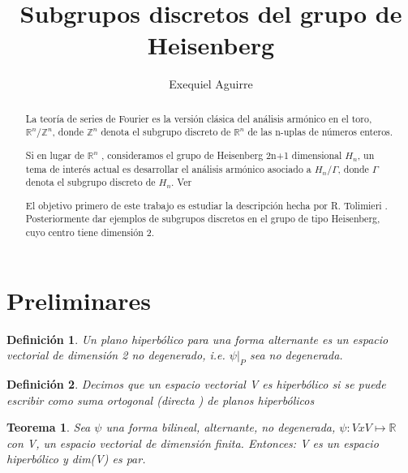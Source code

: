 \documentclass[12pt]{article}
\author{Exequiel Aguirre}
\title{Subgrupos discretos del grupo de Heisenberg }
\date{}
\newtheorem{theorem}{Teorema}
\newtheorem{definition}{Definición}
\begin{document}
\maketitle

\begin{abstract}
La teoría de series de Fourier es la versión clásica del análisis armónico en el toro,
$\mathbb{R}^n /\mathbb{Z}^n$, donde $\mathbb{Z}^n$ denota el subgrupo discreto de $\mathbb{R}^n$ de
las n-uplas de números enteros.

Si en lugar de $\mathbb{R}^n$ , consideramos el grupo de Heisenberg 2n+1 dimensional $H_n$, un tema
de interés actual es desarrollar el análisis armónico asociado a $H_n/\Gamma$, donde $\Gamma$ 
denota el subgrupo discreto de $H_n$. Ver \cite{Th} 

El objetivo primero de este trabajo es estudiar la descripción hecha por R. Tolimieri \cite{To}.
Posteriormente dar ejemplos de subgrupos discretos en el grupo de tipo Heisenberg, cuyo centro tiene
dimensión 2.

\end{abstract}


 

\section{Preliminares}
\begin{definition} 
 Un plano hiperbólico para una forma alternante es un espacio vectorial de dimensión 2 no degenerado,
  i.e. $\psi|_P$ sea no degenerada. 
\end{definition}

\begin{definition}   
 Decimos que un espacio vectorial V es hiperbólico si se puede escribir como suma ortogonal (directa ) de
 planos hiperbólicos
\end{definition}

\begin{theorem}
 Sea $\psi$ una forma bilineal, alternante, no degenerada, $\psi:VxV\mapsto \mathbb{R}$ con V, un espacio 
 vectorial de dimensión finita.
 Entonces: V es un espacio hiperbólico y dim(V) es par.
\end{theorem}
\end{document}
